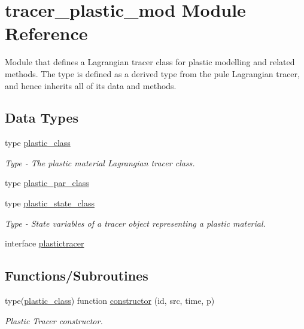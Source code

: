 \hypertarget{namespacetracer__plastic__mod}{}\section{tracer\+\_\+plastic\+\_\+mod Module Reference}
\label{namespacetracer__plastic__mod}


Module that defines a Lagrangian tracer class for plastic modelling and related methods. The type is defined as a derived type from the pule Lagrangian tracer, and hence inherits all of it\textquotesingle{}s data and methods.  


\subsection*{Data Types}
\begin{DoxyCompactItemize}
\item 
type \mbox{\hyperlink{structtracer__plastic__mod_1_1plastic__class}{plastic\+\_\+class}}
\begin{DoxyCompactList}\small\item\em Type -\/ The plastic material Lagrangian tracer class. \end{DoxyCompactList}\item 
type \mbox{\hyperlink{structtracer__plastic__mod_1_1plastic__par__class}{plastic\+\_\+par\+\_\+class}}
\item 
type \mbox{\hyperlink{structtracer__plastic__mod_1_1plastic__state__class}{plastic\+\_\+state\+\_\+class}}
\begin{DoxyCompactList}\small\item\em Type -\/ State variables of a tracer object representing a plastic material. \end{DoxyCompactList}\item 
interface \mbox{\hyperlink{interfacetracer__plastic__mod_1_1plastictracer}{plastictracer}}
\end{DoxyCompactItemize}
\subsection*{Functions/\+Subroutines}
\begin{DoxyCompactItemize}
\item 
type(\mbox{\hyperlink{structtracer__plastic__mod_1_1plastic__class}{plastic\+\_\+class}}) function \mbox{\hyperlink{namespacetracer__plastic__mod_a04049a86055ae0f3f4e26ae51761a5a2}{constructor}} (id, src, time, p)
\begin{DoxyCompactList}\small\item\em Plastic Tracer constructor. \end{DoxyCompactList}\end{DoxyCompactItemize}


